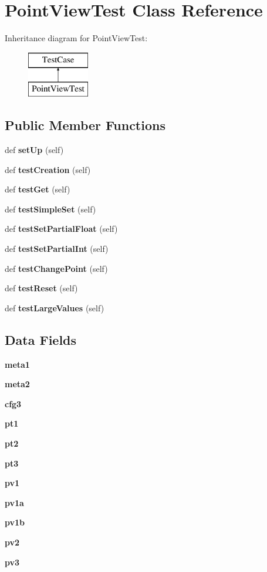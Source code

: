 \section{Point\+View\+Test Class Reference}
\label{classpoint_1_1_point_view_test}
Inheritance diagram for Point\+View\+Test\+:\begin{figure}[H]
\begin{center}
\leavevmode
\includegraphics[height=2.000000cm]{classpoint_1_1_point_view_test}
\end{center}
\end{figure}
\subsection*{Public Member Functions}
\begin{DoxyCompactItemize}
\item 
def {\bf set\+Up} (self)
\item 
def {\bf test\+Creation} (self)
\item 
def {\bf test\+Get} (self)
\item 
def {\bf test\+Simple\+Set} (self)
\item 
def {\bf test\+Set\+Partial\+Float} (self)
\item 
def {\bf test\+Set\+Partial\+Int} (self)
\item 
def {\bf test\+Change\+Point} (self)
\item 
def {\bf test\+Reset} (self)
\item 
def {\bf test\+Large\+Values} (self)
\end{DoxyCompactItemize}
\subsection*{Data Fields}
\begin{DoxyCompactItemize}
\item 
{\bf meta1}
\item 
{\bf meta2}
\item 
{\bf cfg3}
\item 
{\bf pt1}
\item 
{\bf pt2}
\item 
{\bf pt3}
\item 
{\bf pv1}
\item 
{\bf pv1a}
\item 
{\bf pv1b}
\item 
{\bf pv2}
\item 
{\bf pv3}
\end{DoxyCompactItemize}


